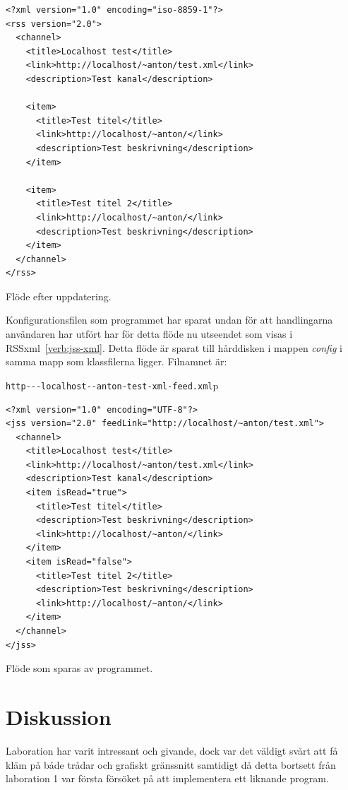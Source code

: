 \documentclass[titlepage, twoside, a4paper, 12pt]{article}
\begin{document}
\begin{program}
\begin{footnotesize}
\begin{verbatim}
<?xml version="1.0" encoding="iso-8859-1"?>
<rss version="2.0">
  <channel>
    <title>Localhost test</title>
    <link>http://localhost/~anton/test.xml</link>
    <description>Test kanal</description>

    <item>
      <title>Test titel</title>
      <link>http://localhost/~anton/</link>
      <description>Test beskrivning</description>
    </item>

    <item>
      <title>Test titel 2</title>
      <link>http://localhost/~anton/</link>
      <description>Test beskrivning</description>
    </item>
  </channel>
</rss>
\end{verbatim}
\end{footnotesize}
\caption{Flöde efter uppdatering.}
\label{verb:2-test-xml}
\end{program}

Konfigurationsfilen som programmet har sparat undan för att
handlingarna användaren har utfört har för detta flöde nu utseendet
som visas i RSSxml~\ref{verb:jss-xml}. Detta flöde är sparat till
hårddisken i mappen \textit{config} i samma mapp som klassfilerna
ligger. Filnamnet är:

\verb!http---localhost--anton-test-xml-feed.xml!p

\begin{program}
\begin{footnotesize}
\begin{verbatim}
<?xml version="1.0" encoding="UTF-8"?>
<jss version="2.0" feedLink="http://localhost/~anton/test.xml">
  <channel>
    <title>Localhost test</title>
    <link>http://localhost/~anton/test.xml</link>
    <description>Test kanal</description>
    <item isRead="true">
      <title>Test titel</title>
      <description>Test beskrivning</description>
      <link>http://localhost/~anton/</link>
    </item>
    <item isRead="false">
      <title>Test titel 2</title>
      <description>Test beskrivning</description>
      <link>http://localhost/~anton/</link>
    </item>
  </channel>
</jss>
\end{verbatim}
\end{footnotesize}
\caption{Flöde som sparas av programmet.}
\label{verb:jss-xml}
\end{program}

\section{Diskussion}\label{Diskussion}
Laboration har varit intressant och givande, dock var det väldigt
svårt att få kläm på både trådar och grafiskt gränssnitt samtidigt då
detta bortsett från laboration 1 var första försöket på att
implementera ett liknande program.
\end{document}
